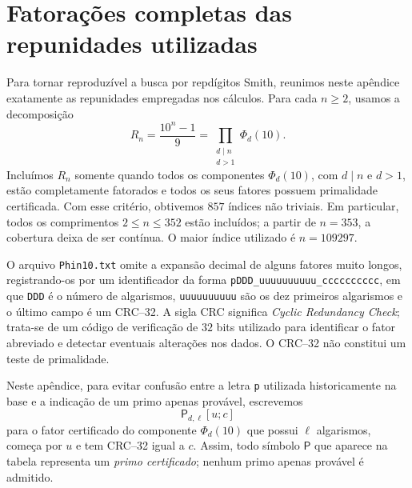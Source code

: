 \documentclass[11pt,a4paper]{article}
\begin{document}
	
\section{Fatorações completas das repunidades utilizadas}
\label{ap:fatoracoes-repunidades}

Para tornar reproduzível a busca por repdígitos Smith, reunimos neste
apêndice exatamente as repunidades empregadas nos cálculos. Para cada
\(n\geq2\), usamos a decomposição
\[
R_n=\frac{10^n-1}{9}
=\prod_{\substack{d\mid n\\ d>1}}\Phi_d(10).
\]
Incluímos \(R_n\) somente quando todos os componentes
\(\Phi_d(10)\), com \(d\mid n\) e \(d>1\), estão completamente
fatorados e todos os seus fatores possuem primalidade certificada.
Com esse critério, obtivemos \(857\) índices não triviais. Em
particular, todos os comprimentos \(2\leq n\leq352\) estão incluídos;
a partir de \(n=353\), a cobertura deixa de ser contínua. O maior
índice utilizado é \(n=109297\).

O arquivo \texttt{Phin10.txt} omite a expansão decimal de alguns
fatores muito longos, registrando-os por um identificador da forma
\texttt{pDDD\_uuuuuuuuuu\_cccccccccc}, em que \texttt{DDD} é o
número de algarismos, \texttt{uuuuuuuuuu} são os dez primeiros
algarismos e o último campo é um CRC--32. A sigla CRC significa
\emph{Cyclic Redundancy Check}; trata-se de um código de verificação
de \(32\) bits utilizado para identificar o fator abreviado e detectar
eventuais alterações nos dados. O CRC--32 não constitui um teste de
primalidade.

Neste apêndice, para evitar confusão entre a letra \texttt{p}
utilizada historicamente na base e a indicação de um primo apenas
provável, escrevemos
\[
\mathsf P_{d,\ell}[u;c]
\]
para o fator certificado do componente \(\Phi_d(10)\) que possui
\(\ell\) algarismos, começa por \(u\) e tem CRC--32 igual a \(c\).
Assim, todo símbolo \(\mathsf P\) que aparece na tabela representa um
\emph{primo certificado}; nenhum primo apenas provável é admitido.

\providecommand{\Rfactor}[1]{\seqsplit{#1}}
\providecommand{\Rfactorpow}[2]{\seqsplit{#1}\(^{#2}\)}
\providecommand{\Rtimes}{\,\(\cdot\)\,}
\providecommand{\Kcert}[4]{%
  \(\mathsf{P}_{\mathrm{#1},#2}
  [\mathtt{#3};\mathtt{#4}]\)%
}
\end{document}
